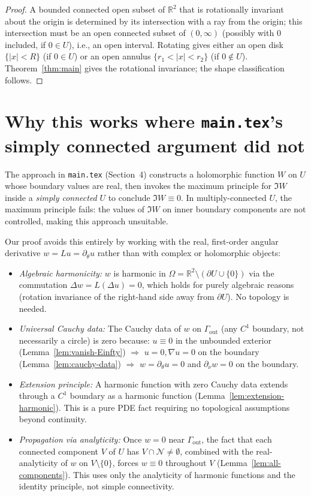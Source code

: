 \documentclass[11pt]{article}
\newcommand{\R}{\mathbb R}
\newcommand{\1}{\mathbf 1}
\begin{document}
\begin{proof}
A bounded connected open subset of $\R^2$ that is rotationally invariant about the origin
is determined by its intersection with a ray from the origin; this intersection must be an
open connected subset of $(0,\infty)$ (possibly with $0$ included, if $0\in U$), i.e., an
open interval. Rotating gives either an open disk $\{|x|<R\}$ (if $0\in U$) or an open
annulus $\{r_1<|x|<r_2\}$ (if $0\notin U$). Theorem~\ref{thm:main} gives the rotational
invariance; the shape classification follows.
\end{proof}

\section{Why this works where \texttt{main.tex}'s simply connected argument did not}

The approach in \texttt{main.tex} (Section~4) constructs a holomorphic function $W$ on $U$
whose boundary values are real, then invokes the maximum principle for $\Im W$ inside a
\emph{simply connected} $U$ to conclude $\Im W\equiv 0$. In multiply-connected $U$, the
maximum principle fails: the values of $\Im W$ on inner boundary components are not
controlled, making this approach unsuitable.

Our proof avoids this entirely by working with the real, first-order angular derivative
$w = L u = \partial_\theta u$ rather than with complex or holomorphic objects:

\begin{itemize}
\item[$(\alpha)$] \emph{Algebraic harmonicity:} $w$ is harmonic in $\Omega=\R^2\setminus
(\partial U\cup\{0\})$ via the commutation $\Delta w = L(\Delta u) = 0$, which holds for
purely algebraic reasons (rotation invariance of the right-hand side away from $\partial U$).
No topology is needed.

\item[$(\beta)$] \emph{Universal Cauchy data:} The Cauchy data of $w$ on $\Gamma_{\mathrm{out}}$
(any $C^1$ boundary, not necessarily a circle) is zero because:
$u\equiv 0$ in the unbounded exterior (Lemma~\ref{lem:vanish-Einfty}) $\Rightarrow$
$u=0,\nabla u=0$ on the boundary (Lemma~\ref{lem:cauchy-data}) $\Rightarrow$
$w=\partial_\theta u=0$ and $\partial_\nu w=0$ on the boundary.

\item[$(\gamma)$] \emph{Extension principle:} A harmonic function with zero Cauchy data
extends through a $C^1$ boundary as a harmonic function (Lemma~\ref{lem:extension-harmonic}).
This is a pure PDE fact requiring no topological assumptions beyond continuity.

\item[$(\delta)$] \emph{Propagation via analyticity:} Once $w=0$ near $\Gamma_{\mathrm{out}}$,
the fact that each connected component $V$ of $U$ has $V\cap\mathcal N\ne\emptyset$, combined
with the real-analyticity of $w$ on $V\setminus\{0\}$, forces $w\equiv 0$ throughout $V$
(Lemma~\ref{lem:all-components}). This uses only the analyticity of harmonic functions
and the identity principle, not simple connectivity.
\end{itemize}
\end{document}
